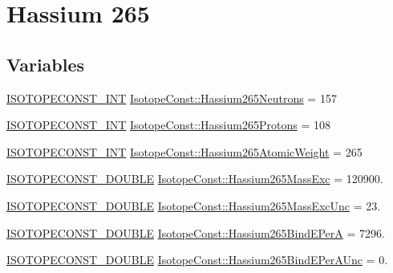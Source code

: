 \hypertarget{group___isotope_const-_hassium-_hs265}{}\section{Hassium 265}
\label{group___isotope_const-_hassium-_hs265}
\subsection*{Variables}
\begin{DoxyCompactItemize}
\item 
\mbox{\hyperlink{group___isotope_const-_macros_ga5f18360b3e99483a35c32d789e62621c}{I\+S\+O\+T\+O\+P\+E\+C\+O\+N\+S\+T\+\_\+\+I\+NT}} \mbox{\hyperlink{group___isotope_const-_hassium-_hs265_ga25926d082a68f896b6225cdcfdb81d67}{Isotope\+Const\+::\+Hassium265\+Neutrons}} = 157
\item 
\mbox{\hyperlink{group___isotope_const-_macros_ga5f18360b3e99483a35c32d789e62621c}{I\+S\+O\+T\+O\+P\+E\+C\+O\+N\+S\+T\+\_\+\+I\+NT}} \mbox{\hyperlink{group___isotope_const-_hassium-_hs265_ga2ff5e3e7cc4fe86aecf062a8abd44e63}{Isotope\+Const\+::\+Hassium265\+Protons}} = 108
\item 
\mbox{\hyperlink{group___isotope_const-_macros_ga5f18360b3e99483a35c32d789e62621c}{I\+S\+O\+T\+O\+P\+E\+C\+O\+N\+S\+T\+\_\+\+I\+NT}} \mbox{\hyperlink{group___isotope_const-_hassium-_hs265_gaf54c93167460fb61600e8aaa9c00ecad}{Isotope\+Const\+::\+Hassium265\+Atomic\+Weight}} = 265
\item 
\mbox{\hyperlink{group___isotope_const-_macros_ga8f45a7272ce02c0b4c65c44636ed719a}{I\+S\+O\+T\+O\+P\+E\+C\+O\+N\+S\+T\+\_\+\+D\+O\+U\+B\+LE}} \mbox{\hyperlink{group___isotope_const-_hassium-_hs265_ga33e5d781f7ce0f4559035faa1c2014b3}{Isotope\+Const\+::\+Hassium265\+Mass\+Exc}} = 120900.
\item 
\mbox{\hyperlink{group___isotope_const-_macros_ga8f45a7272ce02c0b4c65c44636ed719a}{I\+S\+O\+T\+O\+P\+E\+C\+O\+N\+S\+T\+\_\+\+D\+O\+U\+B\+LE}} \mbox{\hyperlink{group___isotope_const-_hassium-_hs265_gaea26652d02a1044612209c38f991e3c6}{Isotope\+Const\+::\+Hassium265\+Mass\+Exc\+Unc}} = 23.
\item 
\mbox{\hyperlink{group___isotope_const-_macros_ga8f45a7272ce02c0b4c65c44636ed719a}{I\+S\+O\+T\+O\+P\+E\+C\+O\+N\+S\+T\+\_\+\+D\+O\+U\+B\+LE}} \mbox{\hyperlink{group___isotope_const-_hassium-_hs265_ga2a9743edead0dd4566fcc3e1e1e6286d}{Isotope\+Const\+::\+Hassium265\+Bind\+E\+PerA}} = 7296.
\item 
\mbox{\hyperlink{group___isotope_const-_macros_ga8f45a7272ce02c0b4c65c44636ed719a}{I\+S\+O\+T\+O\+P\+E\+C\+O\+N\+S\+T\+\_\+\+D\+O\+U\+B\+LE}} \mbox{\hyperlink{group___isotope_const-_hassium-_hs265_gade34093ff23b18f205c2b8aabb7993ce}{Isotope\+Const\+::\+Hassium265\+Bind\+E\+Per\+A\+Unc}} = 0.

\end{DoxyCompactItemize}
